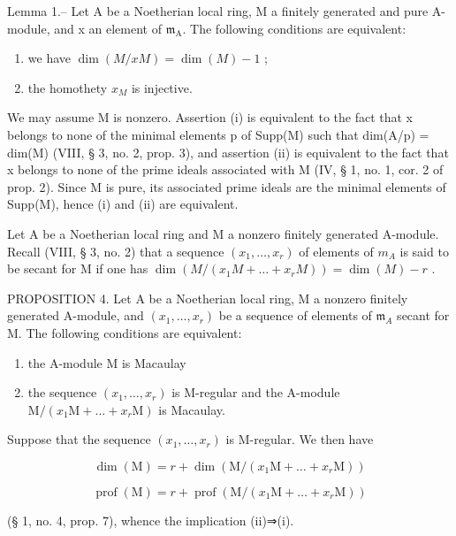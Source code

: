 Lemma 1.-- Let A be a Noetherian local ring, M a finitely generated and pure A-module, and x an element of \(\mathfrak{m}_{\mathrm{A}}\). The following conditions are equivalent:

\begin{enumerate}
\def\labelenumi{(\roman{enumi})}
\item
  we have \(\dim(M/xM)=\dim(M)-1\) ;
\item
  the homothety \(x_{M}\) is injective.
\end{enumerate}

We may assume M is nonzero. Assertion (i) is equivalent to the fact that x belongs to none of the minimal elements p of Supp(M) such that dim(A/p) = dim(M) (VIII, § 3, no. 2, prop. 3), and assertion (ii) is equivalent to the fact that x belongs to none of the prime ideals associated with M (IV, § 1, no. 1, cor. 2 of prop. 2). Since M is pure, its associated prime ideals are the minimal elements of Supp(M), hence (i) and (ii) are equivalent.

Let A be a Noetherian local ring and M a nonzero finitely generated A-module. Recall (VIII, § 3, no. 2) that a sequence \((x_{1},\ldots,x_{r})\) of elements of \(m_{A}\) is said to be secant for M if one has \(\dim(M/(x_{1}M+\ldots+x_{r}M))=\dim(M)-r\) .

PROPOSITION 4. Let A be a Noetherian local ring, M a nonzero finitely generated A-module, and \((x_{1},\ldots ,x_{r})\) be a sequence of elements of \(\mathfrak{m}_{A}\) secant for M. The following conditions are equivalent:

\begin{enumerate}
\def\labelenumi{(\roman{enumi})}
\item
  the A-module M is Macaulay
\item
  the sequence \((x_{1},\ldots,x_{r})\) is M-regular and the A-module \(\mathrm{M}/(x_{1}\mathrm{M}+\ldots+x_{r}\mathrm{M})\) is Macaulay.
\end{enumerate}

Suppose that the sequence \((x_{1},\ldots,x_{r})\) is M-regular. We then have

\[
\dim (\mathrm{M}) = r + \dim (\mathrm{M} / (x _ {1} \mathrm{M} + \dots + x _ {r} \mathrm{M}))
\]

\[
\operatorname{prof} (\mathrm{M}) = r + \operatorname{prof} \left(\mathrm{M} / (x _ {1} \mathrm{M} + \dots + x _ {r} \mathrm{M})\right)
\]

(§ 1, no. 4, prop. 7), whence the implication (ii)⇒(i).

